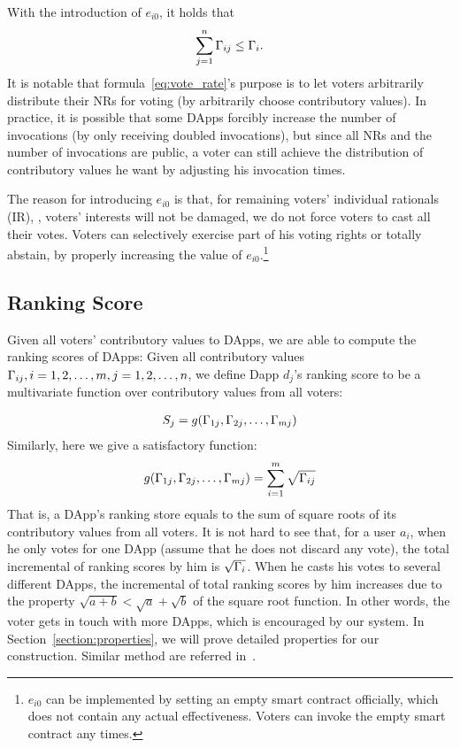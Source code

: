 With the introduction of $e_{i0}$, it holds that
$$\sum_{j=1}^n \Gamma_{ij} \leq \Gamma_i.$$
It is notable that formula~\ref{eq:vote_rate}'s purpose is to let voters
arbitrarily distribute their NRs for voting (by arbitrarily choose contributory
values). In practice, it is possible that some DApps forcibly increase the
number of invocations (by only receiving doubled invocations), but since all
NRs and the number of invocations are public, a voter can still achieve the
distribution of contributory values he want by adjusting his invocation times.

The reason for introducing $e_{i0}$ is that, for remaining voters' individual
rationals (IR), \ie, voters' interests will not be damaged, we do not force voters to cast all their votes. Voters can selectively exercise part of his voting rights or totally abstain, by properly increasing the value of $e_{i0}$.\footnote{$e_{i0}$ can be implemented by setting an empty smart contract officially, which does not contain any actual effectiveness. Voters can invoke the empty smart contract any times.}
\subsection{Ranking Score}
\noindent Given all voters' contributory values to DApps, we are able to compute the
ranking scores of DApps: Given all contributory values
$\Gamma_{ij},i=1,2,\ldots,m,j=1,2,\ldots,n$, we define Dapp $d_j$'s ranking score to be a multivariate function over contributory values from all voters:

\begin{align}
	S_j = g(\Gamma_{1j},\Gamma_{2j},\ldots,\Gamma_{mj})
\end{align}
Similarly, here we give a satisfactory function:
\begin{align}
	\label{eq:sqrt}
	g(\Gamma_{1j},\Gamma_{2j},\ldots,\Gamma_{mj}) = \sum_{i=1}^m \sqrt{\Gamma_{ij}}
\end{align}
That is, a DApp's ranking store equals to the sum of square roots of its
contributory values from all voters. It is not hard to see that, for a user
$a_i$, when he only votes for one DApp (assume that he does not discard any
vote), the total incremental of ranking scores by him is $\sqrt{\Gamma_i}$. When he casts his votes to several different DApps, the incremental of total ranking scores by him increases due to the
property $\sqrt{a+b}<\sqrt{a}+\sqrt{b}$ of the square root function. In other
words, the voter gets in touch with more DApps, which is encouraged by our
system. In Section~\ref{section:properties}, we will prove  detailed properties for our construction. Similar method are referred in~\cite{buterin2018liberal}.

